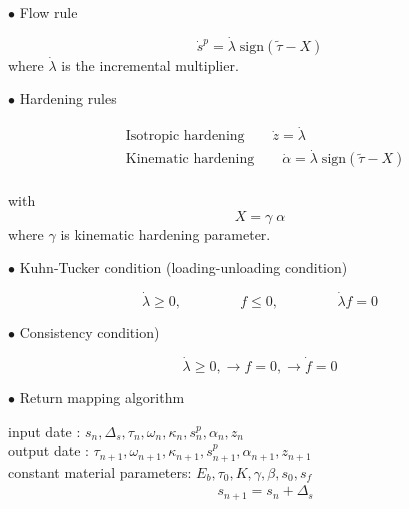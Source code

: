\documentclass[main.tex]{subfiles}
\begin{document}
\begin{description}
  \item[$\bullet$ Flow rule ] 
\end{description}
\begin{equation}
\dot{s}^p = \dot{\lambda} \; \mathrm{sign}(\tilde{\tau} - X)
\end{equation}
where $\dot{\lambda}$ is the incremental multiplier.
\begin{description}
  \item[$\bullet$ Hardening rules] 
\end{description}
\begin{align}
& \mathrm{\mbox{Isotropic hardening}} \qquad \dot{z} = \dot{\lambda}\\
& \mathrm{\mbox{Kinematic hardening}} \qquad \dot{\alpha} = \dot{\lambda} \; \mathrm{sign}(\tilde{\tau} - X)
\end{align}\\ 
with 
\begin{equation}
X = \gamma \; \alpha
\end{equation}
where $\gamma$ is kinematic hardening parameter.

\begin{description}
  \item[$\bullet$ Kuhn-Tucker condition (loading-unloading condition)] 
\end{description}
\begin{equation}
\dot{\lambda} \geq 0, \hspace{50pt}  f\leq 0, \hspace{50pt} \dot{\lambda} f = 0
\end{equation}

\begin{description}
  \item[$\bullet$ Consistency condition)] 
\end{description}
\begin{equation}
\dot{\lambda} \geq 0, \longrightarrow  f = 0, \longrightarrow  \dot{f} = 0
\end{equation}

\begin{description}
  \item[$\bullet$ Return mapping algorithm]
\end{description}
input date : $s_n,\Delta_s , \tau_n , \omega_n ,\kappa_n , s^p_n, \alpha_n , z_n$\\
output date : $ \tau_{n+1} , \omega_{n+1}, \kappa_{n+1}, s^p_{n+1}, \alpha_{n+1} , z_{n+1}$\\
constant material parameters: $E_b, \tau_0, K, \gamma , \beta , s_0 ,s_f $
\begin{align*}
&s_{n+1} = s_n + \Delta_s
\end{align*}
\end{document}
